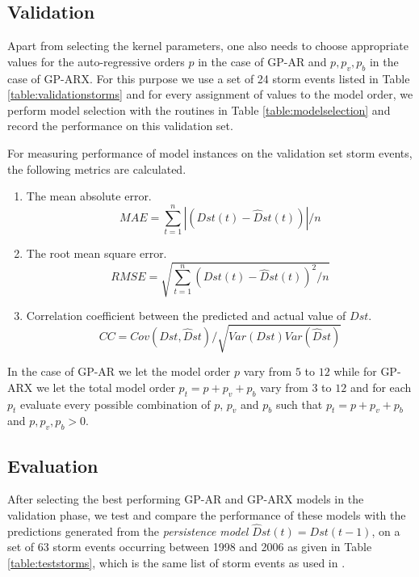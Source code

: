 \documentclass[sw, draft]{AGUTeX}
\begin{document}
\begin{article}
\subsection*{Validation}

Apart from selecting the kernel parameters, one also needs to choose appropriate values for the auto-regressive orders $p$ in the case of GP-AR and $p, p_v, p_b$ in the case of GP-ARX. For this purpose we use a set of 24 storm events listed in Table \ref{table:validationstorms} and for every assignment of values to the model order, we perform model selection with the routines in Table \ref{table:modelselection} and record the performance on this validation set.

For measuring performance of model instances on the validation set storm events, the following metrics are calculated.

\begin{enumerate}
    \item The mean absolute error.
    \begin{equation}
        MAE = \sum_{t=1}^{n} \left |(Dst(t) - \hat{D}st(t)) \right | / n
    \end{equation}
    \item The root mean square error.
    \begin{equation}
        RMSE = \sqrt{\sum_{t=1}^{n} (Dst(t) - \hat{D}st(t))^2 / n}
    \end{equation}
    \item Correlation coefficient between the predicted and actual value of $Dst$.
    \begin{equation}
        CC = Cov(Dst, \hat{D}st)/\sqrt{Var(Dst) Var(\hat{D}st)}
    \end{equation}
\end{enumerate}


In the case of GP-AR we let the model order $p$ vary from $5$ to $12$ while for GP-ARX we let the total model order $p_t = p + p_v + p_b$ vary from $3$ to $12$ and for each $p_t$ evaluate every possible combination of $p$, $p_v$ and $p_b$ such that $p_t = p + p_v + p_b$ and $p, p_{v}, p_b > 0$.

\subsection*{Evaluation}

After selecting the best performing GP-AR and GP-ARX models in the validation phase, we test and compare the performance of these models with the predictions generated from the \emph{persistence model} $\hat{D}st(t) = Dst(t-1)$, on a set of 63 storm events occurring between 1998 and 2006 as given in Table \ref{table:teststorms}, which is the same list of storm events as used in \citet{Ji2012}.



\end{article}
\end{document}
